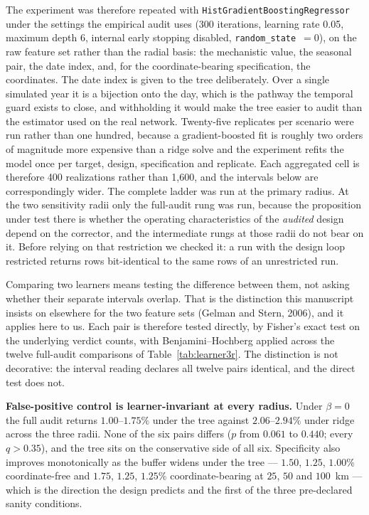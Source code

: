 \documentclass[11pt]{article}
\begin{document}
The experiment was therefore repeated with
\texttt{HistGradientBoostingRegressor} under the settings the empirical audit uses (300 iterations,
learning rate 0.05, maximum depth 6, internal early stopping disabled, \texttt{random\_state}~$=0$),
on the raw feature set rather than the radial basis: the mechanistic value, the seasonal pair, the
date index, and, for the coordinate-bearing specification, the coordinates. The date index is given
to the tree deliberately. Over a single simulated year it is a bijection onto the day, which is the
pathway the temporal guard exists to close, and withholding it would make the tree easier to audit
than the estimator used on the real network. Twenty-five replicates per scenario were run rather than
one hundred, because a gradient-boosted fit is roughly two orders of magnitude more expensive than a
ridge solve and the experiment refits the model once per target, design, specification and replicate.
Each aggregated cell is therefore 400 realizations rather than 1{,}600, and the intervals below are
correspondingly wider. The complete ladder was run at the primary radius. At the two sensitivity radii
only the full-audit rung was run, because the proposition under test there is whether the operating
characteristics of the \emph{audited} design depend on the corrector, and the intermediate rungs at
those radii do not bear on it. Before relying on that restriction we checked it: a run with the design
loop restricted returns rows bit-identical to the same rows of an unrestricted run.

Comparing two learners means testing the difference between them, not asking whether their separate
intervals overlap. That is the distinction this manuscript insists on elsewhere for the two feature
sets (Gelman and Stern, 2006), and it applies here to us. Each pair is therefore tested directly, by
Fisher's exact test on the underlying verdict counts, with Benjamini--Hochberg applied across the
twelve full-audit comparisons of Table~\ref{tab:learner3r}. The distinction is not decorative: the
interval reading declares all twelve pairs identical, and the direct test does not.

\textbf{False-positive control is learner-invariant at every radius.} Under $\beta=0$ the full audit
returns $1.00$--$1.75\%$ under the tree against $2.06$--$2.94\%$ under ridge across the three radii.
None of the six pairs differs ($p$ from $0.061$ to $0.440$; every $q>0.35$), and the tree sits on the
conservative side of all six. Specificity also improves monotonically as the buffer widens under the
tree --- $1.50$, $1.25$, $1.00\%$ coordinate-free and $1.75$, $1.25$, $1.25\%$ coordinate-bearing at
$25$, $50$ and $100$~km --- which is the direction the design predicts and the first of the three
pre-declared sanity conditions.
\end{document}
